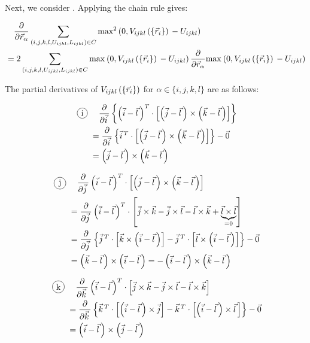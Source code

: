 \documentclass[a4paper]{article}
\newcommand*\circled[1]{
  \tikz[baseline=(char.base)]{
    \node[shape=circle,draw,inner sep=2pt] (char) {#1};
  }
}
\begin{document}
\newpage
Next, we consider \circled{3}. Applying the chain rule gives:

\begin{align*}
  &\quad\frac{\partial}{\partial \vec{r}_{\alpha}} \sum_{\left(i, j, k, l, U_{ijkl}, L_{ijkl}\right) \in C} \textrm{max}^{2} \left( 0, V_{ijkl}\left( \left\{\vec{r}_i \right\} \right){} - U_{ijkl} \right)\\
  &= 2 \sum_{\left(i, j, k, l, U_{ijkl}, L_{ijkl}\right) \in C} \textrm{max}^{} \left( 0, V_{ijkl}\left( \left\{\vec{r}_i \right\} \right){} - U_{ijkl} \right) \frac{\partial}{\partial \vec{r}_{\alpha}} \textrm{max}^{} \left( 0, V_{ijkl}\left( \left\{\vec{r}_i \right\} \right){} - U_{ijkl} \right)
\end{align*}

The partial derivatives of $V_{ijkl}\left( \left\{\vec{r}_i \right\} \right)$ for $\alpha \in \{i, j, k,
l\}$ are as follows:

\begin{align}
  \text{\circled{i}} &\quad \partialVec{i} \left\{ 
    \vecDiff{i}{l}^{T}
    \cdot \left[
      \vecDiff{j}{l}
      \times \vecDiff{k}{l}
    \right]
  \right\} \\
  &= \partialVec{i} \left\{ 
    \vec{i}^{\,T}
    \cdot \left[
      \vecDiff{j}{l}
      \times \vecDiff{k}{l}
    \right]
  \right\} - \vec{0} \\
  &= \vecDiff{j}{l} \times \vecDiff{k}{l} 
\end{align}

\begin{align}
  \text{\circled{j}} &\quad \partialVec{j} 
    \vecDiff{i}{l}^{T}
    \cdot \left[
      \vecDiff{j}{l}
      \times \vecDiff{k}{l}
    \right] \\
  &= \partialVec{j}
    \vecDiff{i}{l}^{T}
    \cdot \left[
      \vec{j} \times \vec{k} - \vec{j} \times \vec{l} - \vec{l} \times \vec{k} + \underbrace{
        \vec{l} \times \vec{l}
      }_{=0}
    \right] \\
  &= \partialVec{j} \left\{
    \vec{j}^{\,T} \cdot \left[
      \vec{k} \times \vecDiff{i}{l}
    \right] 
    - \vec{j}^{\,T} \cdot \left[
      \vec{l} \times \vecDiff{i}{l}
    \right] 
  \right\} - \vec{0} \\
  &= \vecDiff{k}{l} \times \vecDiff{i}{l} 
  = - \vecDiff{i}{l} \times \vecDiff{k}{l}
\end{align}

\begin{align}
  \text{\circled{k}} &\quad \partialVec{k} 
    \vecDiff{i}{l}^{T}
    \cdot \left[
      \vec{j} \times \vec{k} - \vec{j} \times \vec{l} - \vec{l} \times \vec{k} 
    \right] \\
  &= \partialVec{k} \left\{
    \vec{k}^{\,T} \cdot \left[
      \vecDiff{i}{l} \times \vec{j}
    \right] 
    - \vec{k}^{\,T} \cdot \left[
      \vecDiff{i}{l} \times \vec{l}\,
    \right] 
  \right\} - \vec{0} \\
  &= \vecDiff{i}{l} \times \vecDiff{j}{l} 
\end{align}
\end{document}
